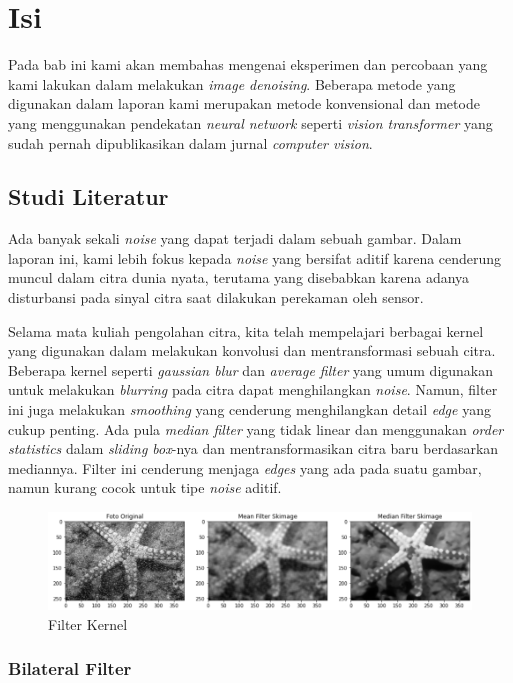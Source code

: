 \documentclass[11pt, a4paper, final]{report}
\begin{document}
\chapter{Isi}

Pada bab ini kami akan membahas mengenai eksperimen dan percobaan yang kami lakukan dalam melakukan \textit{image denoising}. Beberapa metode yang digunakan dalam laporan kami merupakan metode konvensional dan metode yang menggunakan pendekatan \textit{neural network} seperti \textit{vision transformer} yang sudah pernah dipublikasikan dalam jurnal \textit{computer vision}.

\section{Studi Literatur}

Ada banyak sekali \textit{noise} yang dapat terjadi dalam sebuah gambar. Dalam laporan ini, kami lebih fokus kepada \textit{noise} yang bersifat aditif karena cenderung muncul dalam citra dunia nyata, terutama yang disebabkan karena adanya disturbansi pada sinyal citra saat dilakukan perekaman oleh sensor.

Selama mata kuliah pengolahan citra, kita telah mempelajari berbagai kernel yang digunakan dalam melakukan konvolusi dan mentransformasi sebuah citra. Beberapa kernel seperti \textit{gaussian blur} dan \textit{average filter} yang umum digunakan untuk melakukan \textit{blurring} pada citra dapat menghilangkan \textit{noise}. Namun, filter ini juga melakukan \textit{smoothing} yang cenderung menghilangkan detail \textit{edge} yang cukup penting. Ada pula \textit{median filter} yang tidak linear dan menggunakan \textit{order statistics} dalam \textit{sliding box}-nya dan mentransformasikan citra baru berdasarkan mediannya. Filter ini cenderung menjaga \textit{edges} yang ada pada suatu gambar, namun kurang cocok untuk tipe \textit{noise} aditif.

\begin{figure}[H]
\centering
\includegraphics[scale=0.75]{assets/FilterKernel.png}
\caption{Filter Kernel}
\end{figure}

\subsection{Bilateral Filter}
\end{document}

